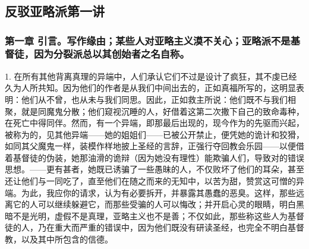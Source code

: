 
\chapter{}


\newline{}\newline{}\newline{}\par



\section{反驳亚略派第一讲}


\subsection{第一章 引言。写作缘由；某些人对亚略主义漠不关心；亚略派不是基督徒，因为分裂派总以其创始者之名自称。}

1. 在所有其他背离真理的异端中，人们承认它们不过是设计了疯狂，其不虔已经久为人所共知。因为他们的作者是从我们中间出去的，正如真福所写的，这明显表明：他们从不曾，也从未与我们同思。因此，正如救主所说：他们既不与我们相聚，就是同魔鬼分散；他们窥视沉睡的人，好借着这第二次撒下自己的致命毒种，在死亡中得同伴。然而，有一个异端，即那最后出现的，现今作为的先驱而兴起，被称为的，见其他异端——她的姐姐们——已被公开禁止，便凭她的诡计和狡猾，如同其父魔鬼一样，装模作样地披上圣经的言辞，正强行夺回教会乐园——以便借着基督徒的伪装，她那油滑的诡辩（因为她没有理性）能欺骗人们，导致对的错误思想。——更有甚者，她既已诱骗了一些愚昧的人，不仅败坏了他们的耳朵，甚至还让他们与一同吃了，直至他们在随之而来的无知中，以苦为甜，赞赏这可憎的异端。为此，我应你的请求，认为有必要拆开，并暴露其愚蠢的恶臭。这样，那些远离它的人可以继续躲避它，而那些受骗的人可以悔改；并开启心灵的眼睛，明白黑暗不是光明，虚假不是真理，亚略主义也不是善；不仅如此，那些称这些人为基督徒的人，乃在重大而严重的错误中，因为他们既没有研读圣经，也完全不明白基督教，以及其中所包含的信德。\par

